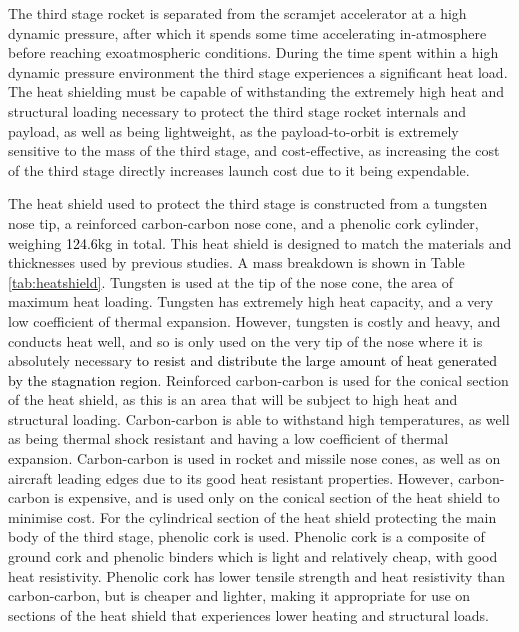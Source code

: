 The third stage rocket is separated from the scramjet accelerator at a high dynamic pressure, after which it spends some time accelerating in-atmosphere before reaching exoatmospheric conditions. During the time spent within a high dynamic pressure environment the third stage experiences a significant heat load. The heat shielding must be capable of withstanding the extremely high heat and structural loading necessary to protect the third stage rocket internals and payload, as well as being lightweight, as the payload-to-orbit is extremely sensitive to the mass of the third stage, and cost-effective, as increasing the cost of the third stage directly increases launch cost due to it being expendable. 

The heat shield used to protect the third stage is constructed from a tungsten nose tip, a reinforced carbon-carbon nose cone, and a phenolic cork cylinder, weighing \textcolor{black}{124.6}kg in total. This heat shield is designed to match the materials and thicknesses used by previous studies\cite{Preller2017b}. A mass breakdown is shown in Table \ref{tab:heatshield}.
Tungsten is used at the tip of the nose cone, the area of maximum heat loading. Tungsten has extremely high heat capacity, and a very low coefficient of thermal expansion\cite{tungsten}. However, tungsten is costly and heavy, and conducts heat well, and so is only used on the very tip of the nose where it is absolutely necessary \textcolor{black}{to resist and distribute the large amount of heat generated by the stagnation region}. 
  Reinforced carbon-carbon is used for the conical section of the heat shield, as this is an area that will be subject to high heat and structural loading. Carbon-carbon is able to withstand high temperatures, as well as being thermal shock resistant and having a low coefficient of thermal expansion\cite{Fitzer}. Carbon-carbon is used in rocket and missile nose cones, as well as on aircraft leading edges due to its good heat resistant properties\cite{Fitzer}. However, carbon-carbon is expensive, and is used only on the conical section of the heat shield to minimise cost. For the cylindrical section of the heat shield protecting the main body of the third stage, phenolic cork is used. Phenolic cork is a composite of ground cork and phenolic binders which is light and relatively cheap, with good heat resistivity. Phenolic cork has lower tensile strength and heat resistivity than carbon-carbon\cite{Composites,Fitzer}, but is cheaper and lighter, making it appropriate for use on sections of the heat shield that experiences lower heating and structural loads. 
